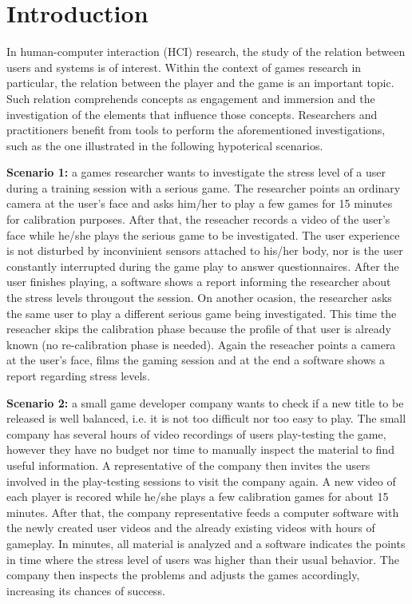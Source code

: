 \chapter{Introduction}
\label{c:introduction}

In human-computer interaction (HCI) research, the study of the relation between users and systems is of interest. Within the context of games research in particular, the relation between the player and the game is an important topic. Such relation comprehends concepts as engagement and immersion \parencite{boyle2012engagement} and the investigation of the elements that influence those concepts. Researchers and practitioners benefit from tools to perform the aforementioned investigations, such as the one illustrated in the following hypoterical scenarios.

\textbf{Scenario 1:} a games researcher wants to investigate the stress level of a user during a training session with a serious game. The researcher points an ordinary camera at the user's face and asks him/her to play a few games for 15 minutes for calibration purposes. After that, the reseacher records a video of the user's face while he/she plays the serious game to be investigated. The user experience is not disturbed by inconvinient sensors attached to his/her body, nor is the user constantly interrupted during the game play to answer questionnaires. After the user finishes playing, a software shows a report informing the researcher about the stress levels througout the session. On another ocasion, the researcher asks the same user to play a different serious game being investigated. This time the reseacher skips the calibration phase because the profile of that user is already known (no re-calibration phase is needed). Again the reseacher points a camera at the user's face, films the gaming session and at the end a software shows a report regarding stress levels.

\textbf{Scenario 2:} a small game developer company wants to check if a new title to be released is well balanced, i.e. it is not too difficult nor too easy to play. The small company has several hours of video recordings of users play-testing the game, however they have no budget nor time to manually inspect the material to find useful information. A representative of the company then invites the users involved in the play-testing sessions to visit the company again. A new video of each player is recored while he/she plays a few calibration games for about 15 minutes. After that, the company representative feeds a computer software with the newly created user videos and the already existing videos with hours of gameplay. In minutes, all material is analyzed and a software indicates the points in time where the stress level of users was higher than their usual behavior. The company then inspects the problems and adjusts the games accordingly, increasing its chances of success.

